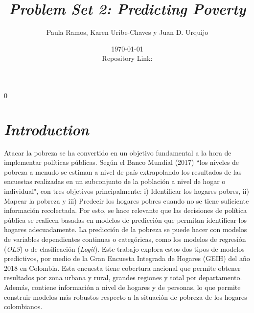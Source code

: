 \documentclass[11pt]{article}
\newcommand{\blind}{0}
\renewcommand{\baselinestretch}{0.8}
\begin{document}
		
		\def\spacingset#1{\renewcommand{\baselinestretch}%
			{#1}\small\normalsize} \spacingset{0.8}
		
		\blind
		{
			\title{\bf \emph{Problem Set 2: Predicting Poverty}}
\author{Paula Ramos, Karen Uribe-Chaves y Juan D. Urquijo} 
\date{\today \\ Repository Link:\href{https://github.com/KarenUC/ProblemSet2_Ramos_Uribe_Urquijo} {\color{blue}{\it Github}}}
			}

   		\maketitle
   		\spacingset{0.85}	

\section{\bf \emph {Introduction}} \label{sec:intro}

\justify
Atacar la pobreza se ha convertido en un objetivo fundamental a la hora de implementar políticas públicas. Según el Banco Mundial (2017) ``los niveles de pobreza a menudo se estiman a nivel de país extrapolando los resultados de las encuestas realizadas en un subconjunto de la población a nivel de hogar o individual", con tres objetivos principalmente: i) Identificar los hogares pobres, ii) Mapear la pobreza y iii) Predecir los hogares pobres cuando no se tiene suficiente información recolectada.  Por esto, se hace relevante que las decisiones de política pública se realicen basadas en modelos de predicción que permitan identificar los hogares adecuadamente.
\justify
La predicción de la pobreza se puede hacer con modelos de variables dependientes continuas o categóricas, como los modelos de regresión (\emph{OLS}) o de clasificación (\emph{Logit}). Este trabajo explora estos dos tipos de modelos predictivos, por medio de la Gran Encuesta Integrada de Hogares (GEIH) del año 2018 en Colombia. Esta encuesta  tiene cobertura nacional que permite obtener resultados por zona urbana y rural, grandes regiones y total por departamento. Además, contiene información a nivel de hogares y de personas, lo que permite construir modelos más robustos respecto a la situación de pobreza de los hogares colombianos.
\end{document}
